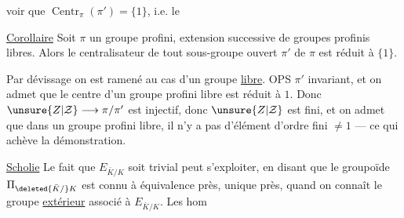 voir que $\operatorname{Centr}_{\pi}(\pi')=\{1\}$, i.e. le

\uline{Corollaire} Soit $\pi$ un groupe profini, extension successive de groupes profinis libres. Alors le centralisateur  de tout sous-groupe ouvert $\pi'$ de $\pi$ est réduit à $\{1\}$.

Par dévissage on est ramené au cas d'un groupe  \uline{libre}.  OPS $\pi'$ invariant, et on admet que le centre d'un groupe profini libre est réduit à $1$.
Donc $\unsure{Z|\mathcal Z}\longrightarrow\pi/\pi'$ est injectif, donc $\unsure{Z|\mathcal Z}$ est fini, et on admet que dans un groupe profini libre, il n'y a pas d'élément d'ordre fini $\neq1$ --- ce qui achève la démonstration.

\uline{Scholie} Le fait que $E_{\bar K/K}$ soit   trivial peut s'exploiter, en disant que le groupoïde $\Pi_{\deleted{\bar K/}K}$  est connu à équivalence près,  unique près, quand on connaît le groupe \uline{extérieur} associé à $E_{\bar K/K}$. Les hom
